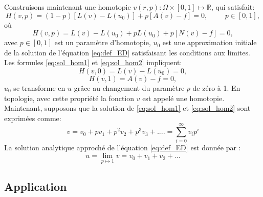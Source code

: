 Construisons maintenant une homotopie $v(r,p): \Omega \times[0,1] \mapsto \mathbb{R}$, qui satisfait:
\begin{equation}\label{eq:sol_hom1}
    H(v,p)=(1-p)[L(v)-L(u_0)]+p[A(v)-f]=0, \hspace{1cm} p\in [0,1],
\end{equation}
où
\begin{equation}\label{eq:sol_hom2}
    H(v,p) = L(v)-L(u_0) +pL(u_0)+p[N(v)-f]=0,
\end{equation}
avec $p\in[0,1]$ est un paramètre d'homotopie, $u_0$ est une approximation initiale de la solution de l'équation \ref{eq:def_ED} satisfaisant les conditions aux limites. Les formules \ref{eq:sol_hom1} et \ref{eq:sol_hom2} impliquent:
\begin{equation}
    H(v,0)=L(v)-L(u_0)=0,
\end{equation}
\begin{equation}
    H(v,1)=A(v)-f=0,
\end{equation}
$u_0$ se transforme en $u$ grâce au changement du paramètre $p$ de zéro à 1. En topologie, avec cette propriété la fonction $v$ est appelé une homotopie. Maintenant, supposons que la solution de \ref{eq:sol_hom1} et \ref{eq:sol_hom2} sont exprimées comme:
\begin{equation}
    v=v_0+pv_1+p^2v_2+p^3v_3+ .... = \sum_{i=0}^{\infty}v_ip^i
\end{equation}
La solution analytique approché de l'équation \ref{eq:def_ED} est donnée par :
\begin{equation}
    u=\lim_{p\mapsto1}v = v_0 + v_1+v_2 +...
\end{equation} 
\subsection{Application}
